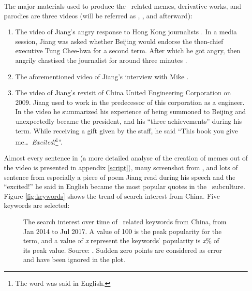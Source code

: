 The major materials used to produce the \moha\ related memes, derivative works, and parodies are three videos (will be referred as , , and  afterward):
\begin{enumerate}
	\item The video of Jiang's angry response to Hong Kong journalists \citep{pbs_nc_2000}. In a media session, Jiang was asked whether Beijing would endorse the then-chief executive Tung Chee-hwa for a second term. After which he got angry,  then angrily chastised the journalist for around three minutes \citep{landler_leader_2000}.
	\item The aforementioned video of Jiang's interview with Mike \citet{wallace_president_2000}.
	\item The video of Jiang's revisit of China United Engineering Corporation on 2009. Jiang used to work in the predecessor of this corporation as a engineer. In the video he summarized his experience of being summoned to Beijing and unexpectedly became the president, and his ``three achievements'' during his term. While receiving a gift given by the staff, he said ``This book you give me\ldots\ \textit{Excited!}\footnote{The word was said in English.}''.
\end{enumerate}
Almost every sentence in  (a more detailed analyse of the creation of memes out of the video is presented in appendix \vref{script}), many screenshot from , and lots of sentence from  especially a piece of poem Jiang read during his speech and the ``excited!'' he said in English became the most popular quotes in the \moha\ subculture. Figure \vref{fig:keywords} shows the trend of search interest from China. Five keywords are selected:
\begin{figure*}[ht]
	\centering
	
	\caption[The search interest over time of \moha\ related keywords from China, from Jan 2014 to Jul 2017]{The search interest over time of \moha\ related keywords from China, from Jan 2014 to Jul 2017. A value of 100 is the peak popularity for the term, and a value of \textit{x} represent the keywords' popularity is \textit{x}\% of its peak value. Source: \citet{google_google_????}. Sudden zero points are considered as error and have been ignored in the plot.}
	\label{fig:keywords}
\end{figure*}
